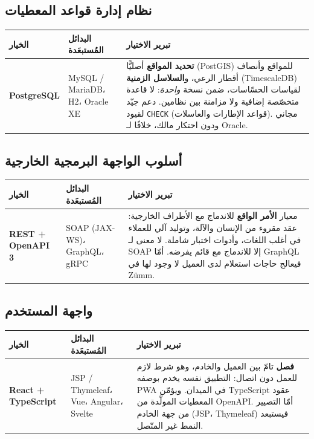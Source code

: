 \subsection{نظام إدارة قواعد المعطيات}
\begin{xltabular}{\textwidth}{>{\bfseries}p{2.7cm} p{4.2cm} X}
\toprule
\textbf{الخيار} & \textbf{البدائل المُستبعَدة} & \textbf{تبرير الاختيار} \\
\midrule
\endhead
PostgreSQL & MySQL / MariaDB، H2، Oracle XE & \textbf{تحديد المواقع} أصليًّا (PostGIS) للمواقع وأنصاف أقطار الرعي، و\textbf{السلاسل الزمنية} (TimescaleDB) لقياسات الحسّاسات، ضمن نسخة \emph{واحدة}: لا قاعدة متخصّصة إضافية ولا مزامنة بين نظامين. دعم جيّد لقيود \texttt{CHECK} (قواعد الإطارات والعاسلات). مجاني ودون احتكار مالك، خلافًا لـ Oracle. \\
\bottomrule
\end{xltabular}

\subsection{أسلوب الواجهة البرمجية الخارجية}
\begin{xltabular}{\textwidth}{>{\bfseries}p{2.7cm} p{4.2cm} X}
\toprule
\textbf{الخيار} & \textbf{البدائل المُستبعَدة} & \textbf{تبرير الاختيار} \\
\midrule
\endhead
REST + OpenAPI 3 & SOAP (JAX-WS)، GraphQL، gRPC & معيار \textbf{الأمر الواقع} للاندماج مع الأطراف الخارجية: عقد مقروء من الإنسان والآلة، وتوليد آلي للعملاء في أغلب اللغات، وأدوات اختبار شاملة. لا معنى لـ SOAP إلا للاندماج مع قائم يفرضه. أمّا GraphQL فيعالج حاجات استعلام لدى العميل لا وجود لها في Zümm. \\
\bottomrule
\end{xltabular}

\subsection{واجهة المستخدم}
\begin{xltabular}{\textwidth}{>{\bfseries}p{2.7cm} p{4.2cm} X}
\toprule
\textbf{الخيار} & \textbf{البدائل المُستبعَدة} & \textbf{تبرير الاختيار} \\
\midrule
\endhead
React + TypeScript & JSP / Thymeleaf، Vue، Angular، Svelte & \textbf{فصل} تامّ بين العميل والخادم، وهو شرط لازم للعمل دون اتصال: التطبيق نفسه يخدم بوصفه PWA في الميدان. ويؤمّن TypeScript عقود المعطيات المولَّدة من OpenAPI. أمّا التصيير من جهة الخادم (JSP، Thymeleaf) فيستبعد النمط غير المتّصل. \\
\bottomrule
\end{xltabular}

